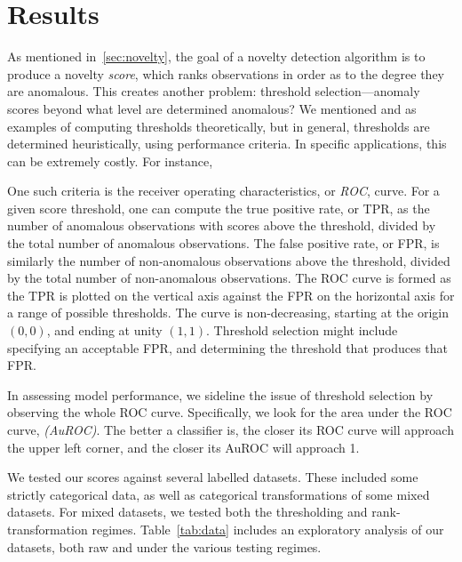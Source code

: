 \section{Results\label{sec:results}}
As mentioned in~\ref{sec:novelty}, the goal of a novelty detection algorithm is to
    produce a novelty \emph{score}, which ranks observations in order as to the degree 
    they are anomalous.  This creates another problem: threshold selection---anomaly 
    scores beyond what level are determined anomalous?  We mentioned \cite{clifton2011}
    and \cite{gu2021} as examples of computing thresholds theoretically, but in general,
    thresholds are determined heuristically, using performance criteria.  In specific
    applications, this can be extremely costly.   For instance, 

One such criteria is the receiver operating characteristics, or \emph{ROC}, curve.  For
    a given score threshold, one can compute the true positive rate, or TPR, as the number 
    of anomalous observations with scores above the threshold, divided by the total number 
    of anomalous observations.  The false positive rate, or FPR, is similarly the number 
    of non-anomalous observations above the threshold, divided by the total number of 
    non-anomalous observations.  The ROC curve is formed as the TPR is plotted on the 
    vertical axis against the FPR on the horizontal axis for a range of possible 
    thresholds.  The curve is non-decreasing, starting at the origin $(0,0)$, and ending at
    unity $(1,1)$.  Threshold selection might include specifying an acceptable FPR, and 
    determining the threshold that produces that FPR.

In assessing model performance, we sideline the issue of threshold selection by 
    observing the whole ROC curve.  Specifically, we look for the area under the ROC 
    curve, \emph{(AuROC)}.  The better a classifier is, the closer its ROC curve will approach
    the upper left corner, and the closer its AuROC will approach 1.


We tested our scores against several labelled datasets.  These included some strictly
    categorical data, as well as categorical transformations of some mixed datasets.
    For mixed datasets, we tested both the thresholding and rank-transformation regimes. 
    Table~\ref{tab:data} includes an exploratory analysis of our datasets, both raw and
    under the various testing regimes.


